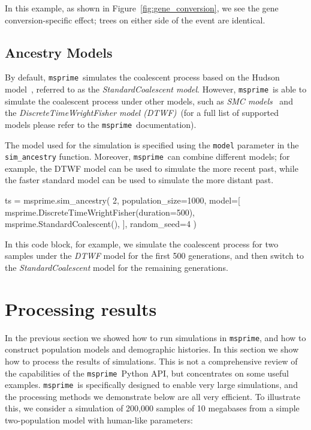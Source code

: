 \documentclass[graybox]{svmult}
\newcommand{\msprime}[0]{\texttt{msprime}}
\begin{document}
In this example, as shown in Figure~\ref{fig:gene_conversion}, we see the gene conversion-specific effect; trees on either side of the event are identical.

\subsection{Ancestry Models}\label{ancestry-models}

By default, \msprime\ simulates the coalescent process based on the Hudson model~\citep{hudson1983properties}, referred to as the
\emph{StandardCoalescent model}. However, \msprime\ is able to simulate the coalescent process under other models, such as
\emph{SMC models}~\citep{mcvean2005approximating} and the \emph{DiscreteTimeWrightFisher model (DTWF)}~\citep{nelson_accounting_2020}(for a full list of
supported models please refer to the \msprime\ documentation).

The model used for the simulation is specified using the \texttt{model} parameter
in the \texttt{sim\_ancestry} function. Moreover, \msprime\ can combine different models; for example, the DTWF model can be used to simulate the more recent
past, while the faster standard model can be used to simulate the more distant past.

\begin{pythoncode}
ts = msprime.sim_ancestry(
    2,
    population_size=1000,
    model=[
        msprime.DiscreteTimeWrightFisher(duration=500),
        msprime.StandardCoalescent(),
    ],
    random_seed=4
)

\end{pythoncode}

In this code block, for example, we simulate the coalescent process for two samples under the \emph{DTWF} model for the first 500 generations,
and then switch to the \emph{StandardCoalescent} model for the remaining generations.


\section{Processing results}\label{processing-results}

In the previous section we showed how to run simulations in \msprime, and
how to construct population models and demographic histories. In this
section we show how to process the results of simulations. This is not a
comprehensive review of the capabilities of the \msprime\ Python API, but
concentrates on some useful examples.
\msprime\ is specifically designed to enable very large simulations, and
the processing methods we demonstrate below are all very efficient. To
illustrate this, we consider a simulation of 200,000 samples of 10 megabases
from a simple two-population model with human-like parameters:
\end{document}
